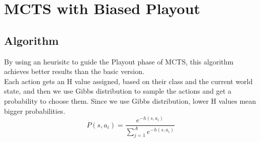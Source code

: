 \documentclass{article}
\begin{document}
  \section{MCTS with Biased Playout}
  \subsection{Algorithm}
  By using an heurisitc to guide the Playout phase of MCTS, this algorithm achieves better results than the basic version.\\
  Each action gets an H value assigned, based on their class and the current world state, and then we use Gibbs distribution to sample the actions and get a probability to choose them. 
  Since we use Gibbs distribution, lower H values mean bigger probabilities.\\
  \[P(s,a_i) = \frac{e^{-h(s, a_i)}}{\sum_{j=1}^{A}e^{-h(s, a_i)}}\]
  
\end{document}
